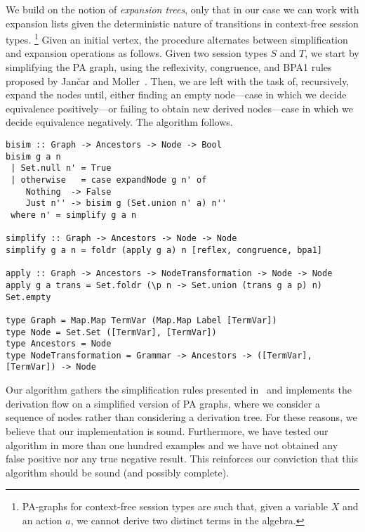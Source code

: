 We build on the notion of \emph{expansion trees}, only that in our
case we can work with expansion lists given the deterministic nature
of transitions in context-free session types.%
\footnote{PA-graphs for context-free session types are such that,
  given a variable $X$ and an action $a$, we cannot derive two
  distinct terms in the algebra.}
%
Given an initial vertex, the procedure alternates between
simplification and expansion operations as follows.
%
Given two session types $S$ and $T$, we start by simplifying the PA
graph, using the reflexivity, congruence, and BPA1 rules proposed by
Jan{\v{c}}ar and Moller~\cite{janvcar1999techniques}.
%
Then, we are left with the task of, recursively, expand the nodes
until, either finding an empty node---case in which we decide
equivalence positively---or failing to obtain new derived nodes---case
in which we decide equivalence negatively. The algorithm follows.
%
\begin{lstlisting}
bisim :: Graph -> Ancestors -> Node -> Bool
bisim g a n
 | Set.null n' = True
 | otherwise   = case expandNode g n' of
    Nothing  -> False
    Just n'' -> bisim g (Set.union n' a) n''
 where n' = simplify g a n

simplify :: Graph -> Ancestors -> Node -> Node
simplify g a n = foldr (apply g a) n [reflex, congruence, bpa1]

apply :: Graph -> Ancestors -> NodeTransformation -> Node -> Node
apply g a trans = Set.foldr (\p n -> Set.union (trans g a p) n) Set.empty

type Graph = Map.Map TermVar (Map.Map Label [TermVar])
type Node = Set.Set ([TermVar], [TermVar])
type Ancestors = Node
type NodeTransformation = Grammar -> Ancestors -> ([TermVar], [TermVar]) -> Node
\end{lstlisting}


Our algorithm gathers the simplification rules presented
in~\cite{janvcar1999techniques} and implements the derivation flow on
a simplified version of PA graphs, where we consider a sequence of
nodes rather than considering a derivation tree. For these reasons, we
believe that our implementation is sound. Furthermore, we have tested
our algorithm in more than one hundred examples and we have not
obtained any false positive nor any true negative result. This
reinforces our conviction that this algorithm should be sound (and
possibly complete).

